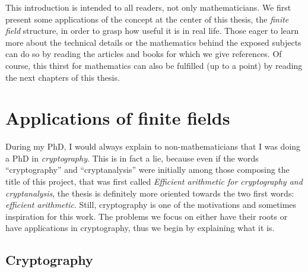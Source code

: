 This introduction is intended to all readers, not only mathematicians. We
first present some applications of the concept at the center of this thesis, the
\emph{finite field} structure, in order to grasp how useful it is in real life.
Those eager to learn more about the technical details or the mathematics behind
the exposed subjects can do so by reading the articles and books for which we
give references. Of course, this thirst for mathematics can also be fulfilled
(up to a point) by reading the next chapters of this thesis.

\minitoc
%
\clearpage

\section{Applications of finite fields}

During my PhD, I would always explain to non-mathematicians that I was doing a
PhD in \emph{cryptography}. This is in fact a lie, because even if
the words ``cryptography'' and ``cryptanalysis'' were initially among those composing
the title of this project, that was first called \emph{Efficient arithmetic for
cryptography and cryptanalysis}, the thesis is definitely more oriented
towards the two first words: \emph{efficient arithmetic}. Still, cryptography
is one of the motivations and sometimes inspiration for this work. The problems
we focus on either have their roots or have applications in cryptography, thus
we begin by explaining what it is.

\subsection{Cryptography}
\label{sec:crypto}

